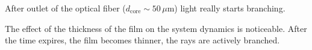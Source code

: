 

After outlet of the optical fiber ($d_{\text{core}} \sim 50 \, \mu$m) light really starts branching.

\begin{figure}[h]
    \hspace{5 mm} 
\end{figure}

The effect of the thickness of the film on the system dynamics is noticeable. After the time expires, the film becomes thinner, the rays are actively branched.